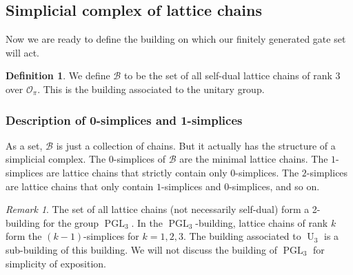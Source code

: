 \documentclass{eptcs}
\theoremstyle{remark}
\newtheorem{remark}[theorem]{Remark}
\theoremstyle{definition}
\newtheorem{definition}[theorem]{Definition}
\DeclareMathOperator{\PGL}{PGL}
\DeclareMathOperator{\U}{U}
\begin{document}
\subsection{Simplicial complex of lattice chains}

Now we are ready to define the building on which our finitely generated gate set will act. 
\begin{definition}
We define $\mathcal{B}$ to be the set of all self-dual lattice chains of rank $3$ over $\mathcal{O}_{\pi}$. This is the building associated to the unitary group.
\end{definition}

\subsubsection{Description of 0-simplices and 1-simplices}

As a set, $\mathcal{B}$ is just a collection of chains. But it actually has the structure of a simplicial complex. The $0$-simplices of $\mathcal{B}$ are the minimal lattice chains. The $1$-simplices are lattice chains that strictly contain only $0$-simplices. The $2$-simplices are lattice chains that only contain $1$-simplices and $0$-simplices, and so on.

\begin{remark}
    The set of all lattice chains (not necessarily self-dual) form a 2-building for the group $\PGL_3$. In the $\PGL_3$-building, lattice chains of rank $k$ form the $(k-1)$-simplices for $k=1,2,3$.
    The building associated to $\U_{3}$ is a sub-building of this building.
    We will not discuss the building of $\PGL_3$ for simplicity of exposition.
\end{remark}
\end{document}
